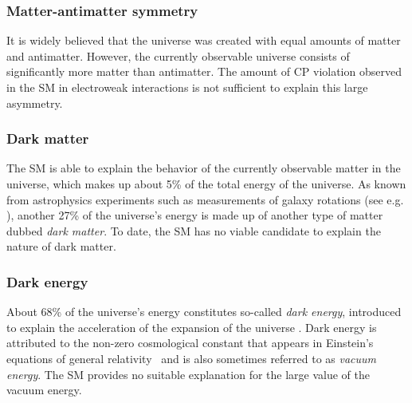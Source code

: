 \subsubsection{Matter-antimatter symmetry}
It is widely believed that the universe was created with equal amounts of matter and antimatter.
However, the currently observable universe consists of significantly more matter than antimatter. 
The amount of CP violation observed in the SM in electroweak interactions is not sufficient to explain this large asymmetry.

\subsubsection{Dark matter}
The SM is able to explain the behavior of the currently observable matter in the universe, which makes up about 5\% of the total energy of the universe. 
As known from astrophysics experiments such as measurements of galaxy rotations (see e.g. ), another 27\% of the universe's energy is made up of another type of matter dubbed \emph{dark matter}. To date, the SM has no viable candidate to explain the nature of dark matter. 


\subsubsection{Dark energy}
About 68\% of the universe's energy constitutes so-called \emph{dark energy}, introduced to explain the acceleration of the expansion of the universe \cite{Riess_1998,Perlmutter_1999}. Dark energy is attributed to the non-zero cosmological constant that appears in Einstein's equations of general relativity~\cite{Einstein1916} and is also sometimes referred to as \emph{vacuum energy}. The SM provides no suitable explanation for the large value of the vacuum energy.

